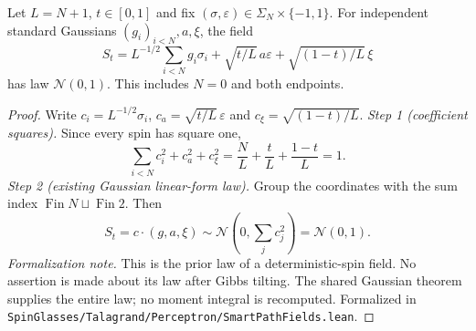 \begin{lemma}\label{lem:sg-tal:perceptron-path-fields}
  \leanok
Let $L=N+1$, $t\in[0,1]$ and fix $(\sigma,\varepsilon)\in\Sigma_N\times\{-1,1\}$.
For independent standard Gaussians $(g_i)_{i<N},a,\xi$, the field
\[
 S_t=L^{-1/2}\sum_{i<N}g_i\sigma_i+\sqrt{t/L}\,a\varepsilon
       +\sqrt{(1-t)/L}\,\xi
\]
has law $\mathcal N(0,1)$. This includes $N=0$ and both endpoints.
\end{lemma}
\begin{proof}
  \leanok
Write $c_i=L^{-1/2}\sigma_i$, $c_a=\sqrt{t/L}\,\varepsilon$ and
$c_\xi=\sqrt{(1-t)/L}$.
\emph{Step 1 (coefficient squares).} Since every spin has square one,
\[
 \sum_{i<N}c_i^2+c_a^2+c_\xi^2
 =\frac{N}{L}+\frac{t}{L}+\frac{1-t}{L}=1.
\]
\emph{Step 2 (existing Gaussian linear-form law).} Group the coordinates with the sum index
$\operatorname{Fin}N\sqcup\operatorname{Fin}2$. Then
\[
 S_t=c\cdot(g,a,\xi)\sim\mathcal N\left(0,\sum_jc_j^2\right)=\mathcal N(0,1).
\]
\emph{Formalization note.} This is the prior law of a deterministic-spin field. No assertion
is made about its law after Gibbs tilting. The shared Gaussian theorem supplies the entire law;
no moment integral is recomputed.
Formalized in \texttt{SpinGlasses/Talagrand/Perceptron/SmartPathFields.lean}.
\end{proof}

